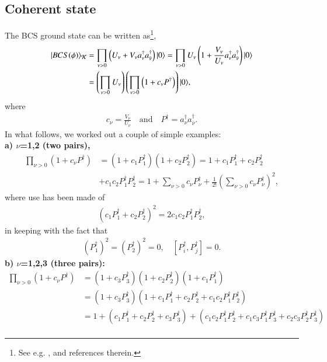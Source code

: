 \begin{subappendices}
\section[Coherent state]{Coherent state}\label{App3E}
The BCS ground state can be written as\footnote{See e.g. \cite{Potel:13b}, and references therein.},
\begin{align}\label{eq1App3Ex} 
\nonumber |{BCS(\phi)} \rangle_{\mathcal K}&=\prod_{\nu>0}\left(U_\nu+V_\nu a_\nu^\dagger a_{\bar{\nu}}^\dagger\right)|{0} \rangle=\prod_{\nu>0}U_\nu\left(1+\frac{V_\nu}{U_\nu} a_\nu^\dagger a_{\bar{\nu}}^\dagger\right)|{0} \rangle\\
&=\left(\prod_{\nu>0}U_\nu\right)\left(\prod_{\nu>0}\left(1+c_\nu P^\dagger\right)\right)|{0} \rangle,
\end{align}
where
\begin{align}\label{eq2App3Ex} 
 c_\nu=\frac{V_\nu}{U_\nu}\quad\text{and}\quad P^\dagger=a_\nu^\dagger a_{\bar{\nu}}^\dagger.
\end{align}
In what follows, we worked out a couple of simple examples:\\
\textbf{a) $\nu$=1,2 (two pairs),}
\begin{align}\label{eq2App4Ex} 
 \nonumber \prod_{\nu>0}\left(1+c_\nu P^\dagger\right)&=\left(1+c_1P_1^\dagger\right)\left(1+c_2P_2^\dagger\right)=1+c_1P_1^\dagger+c_2P_2^\dagger\\
 &+c_1c_2P_1^\dagger P_2^\dagger=1+\sum_{\nu>0}c_\nu P_\nu^\dagger + \frac{1}{2!}\left(\sum_{\nu>0}c_\nu P^\dagger_\nu\right)^2,
\end{align}
where use has been made of
\begin{align}\label{eq2App5Ex} 
\left(c_1P_1^\dagger+ c_2P_2^\dagger\right)^2=2c_1c_2P_1^\dagger P_2^\dagger,
\end{align}
in keeping with  the fact that
\begin{align}\label{eq2App6Ex}
\left(P_1^\dagger\right)^2=\left(P_2^\dagger\right)^2=0,\quad \left[P_i^\dagger,P_j^\dagger\right]=0.
\end{align}
\textbf{b) $\nu$=1,2,3 (three pairs):}
\begin{align}\label{eq2App7Ex}
\nonumber \prod_{\nu>0}\left(1+c_\nu P^\dagger\right)&=\left(1+c_3P_3^\dagger\right)\left(1+c_2P_2^\dagger\right)\left(1+c_1P_1^\dagger\right)\\
\nonumber &=\left(1+c_3P_3^\dagger\right)\left(1+c_1P_1^\dagger+c_2P_2^\dagger+c_1c_2P_1^\dagger P_2^\dagger\right)\\
\nonumber&=1+\left(c_1P_1^\dagger+c_2P_2^\dagger+c_3P_3^\dagger\right)+\left(c_1c_2P_1^\dagger P_2^\dagger+c_1c_3P_1^\dagger P_3^\dagger+c_2c_3P_2^\dagger P_3^\dagger\right)\\

\end{align}
\end{subappendices}
